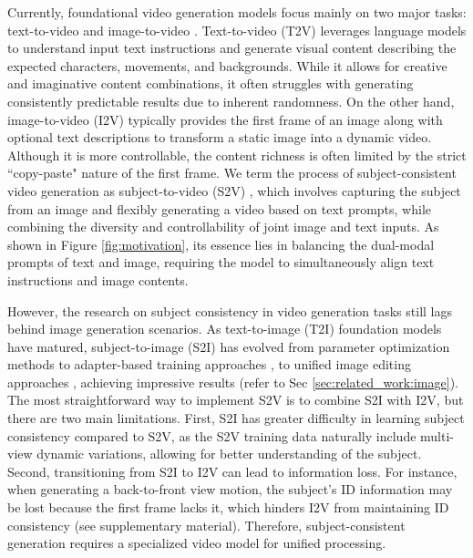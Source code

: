 Currently, foundational video generation models focus mainly on two major tasks: text-to-video\cite{OpenAI2023Sora} and image-to-video \cite{blattmann2023stable}. 
Text-to-video (T2V) leverages language models to understand input text instructions and generate visual content describing the expected characters, movements, and backgrounds. While it allows for creative and imaginative content combinations, it often struggles with generating consistently predictable results due to inherent randomness. 
On the other hand, image-to-video (I2V) typically provides the first frame of an image along with optional text descriptions to transform a static image into a dynamic video. Although it is more controllable, the content richness is often limited by the strict ``copy-paste" \cite{polyak2024movie, chen2025multi} nature of the first frame.
We term the process of subject-consistent video generation as subject-to-video (S2V) \cite{huang2025conceptmaster, chen2025multi, Hailuo}, which involves capturing the subject from an image and flexibly generating a video based on text prompts, while combining the diversity and controllability of joint image and text inputs. As shown in Figure \ref{fig:motivation}, its essence lies in balancing the dual-modal prompts of text and image, requiring the model to simultaneously align text instructions and image contents.


However, the research on subject consistency in video generation tasks still lags behind image generation scenarios. 
As text-to-image (T2I) foundation models \cite{flux2024, esser2024scaling} have matured, subject-to-image (S2I) has evolved from parameter optimization methods \cite{ huang2024context, ruiz2023dreambooth} to adapter-based training approaches \cite{ye2023ip, huang2024realcustom}, to unified image editing approaches \cite{chen2024unireal, xiao2024omnigen, wanx_ace}, achieving impressive results (refer to Sec \ref{sec:related_work:image}).
The most straightforward way to implement S2V is to combine S2I with I2V, but there are two main limitations. First, S2I has greater difficulty in learning subject consistency compared to S2V, as the S2V training data naturally include multi-view dynamic variations, allowing for better understanding of the subject.
Second, transitioning from S2I to I2V can lead to information loss. For instance, when generating a back-to-front view motion, the subject's ID information may be lost because the first frame lacks it, which hinders I2V from maintaining ID consistency (see supplementary material).
Therefore, subject-consistent generation requires a specialized video model for unified processing.

